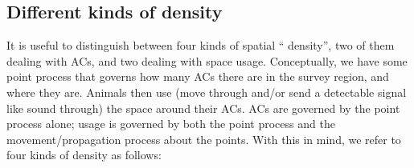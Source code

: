 \documentclass[10pt,a4paper]{article}
\begin{document}

\subsection{Different kinds of density}

It is useful to distinguish between four kinds of spatial `` density'', two of them dealing with ACs, and two dealing with space usage. Conceptually, we have some point process that governs how many ACs there are in the survey region, and where they are. Animals then use (move through and/or send a detectable signal like sound through) the space around their ACs. ACs are governed by the point process alone; usage is governed by both the point process and the movement/propagation process about the points. With this in mind, we refer to four kinds of density as follows:
\end{document}
